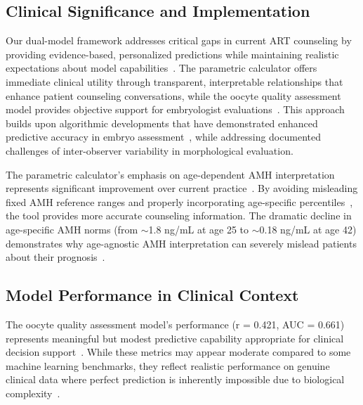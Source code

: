 \documentclass[pdflatex,sn-basic]{sn-jnl}%
\begin{document}
\subsection{Clinical Significance and Implementation}

Our dual-model framework addresses critical gaps in current ART counseling by providing evidence-based, personalized predictions while maintaining realistic expectations about model capabilities~\cite{gameiro2023understanding,asrm2021counselors}. The parametric calculator offers immediate clinical utility through transparent, interpretable relationships that enhance patient counseling conversations, while the oocyte quality assessment model provides objective support for embryologist evaluations~\cite{paternot2009observer,paternot2011multicentre,fordham2022embryologist}. This approach builds upon algorithmic developments that have demonstrated enhanced predictive accuracy in embryo assessment~\cite{rave2024bonna}, while addressing documented challenges of inter-observer variability in morphological evaluation.

The parametric calculator's emphasis on age-dependent AMH interpretation represents significant improvement over current practice~\cite{ovarian_reserve_testing}. By avoiding misleading fixed AMH reference ranges and properly incorporating age-specific percentiles~\cite{lee2017amh,song2021amh}, the tool provides more accurate counseling information. The dramatic decline in age-specific AMH norms (from $\sim$1.8 ng/mL at age 25 to $\sim$0.18 ng/mL at age 42) demonstrates why age-agnostic AMH interpretation can severely mislead patients about their prognosis~\cite{lee2017amh}.

\subsection{Model Performance in Clinical Context}

The oocyte quality assessment model's performance (r = 0.421, AUC = 0.661) represents meaningful but modest predictive capability appropriate for clinical decision support~\cite{varoquaux2022machine,rajkomar2019machine}. While these metrics may appear moderate compared to some machine learning benchmarks, they reflect realistic performance on genuine clinical data where perfect prediction is inherently impossible due to biological complexity~\cite{litjens2017survey}.
\end{document}
